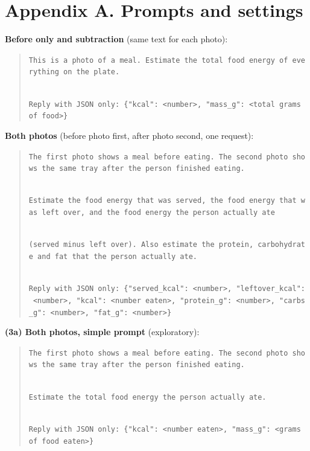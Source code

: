 \documentclass[
  11pt,
  letterpaper]{article}
\begin{document}
\section*{Appendix A. Prompts and settings}\label{appendix-a.-prompts-and-settings}

\textbf{Before only and subtraction} (same text for each photo):

\begin{quote}
\texttt{This\ is\ a\ photo\ of\ a\ meal.\ Estimate\ the\ total\ food\ energy\ of\ everything\ on\ the\ plate.}\strut \\
\texttt{Reply\ with\ JSON\ only:\ \{"kcal":\ \textless{}number\textgreater{},\ "mass\_g":\ \textless{}total\ grams\ of\ food\textgreater{}\}}
\end{quote}

\textbf{Both photos} (before photo first, after photo second, one request):

\begin{quote}
\texttt{The\ first\ photo\ shows\ a\ meal\ before\ eating.\ The\ second\ photo\ shows\ the\ same\ tray\ after\ the\ person\ finished\ eating.}\strut \\
\texttt{Estimate\ the\ food\ energy\ that\ was\ served,\ the\ food\ energy\ that\ was\ left\ over,\ and\ the\ food\ energy\ the\ person\ actually\ ate}\strut \\
\texttt{(served\ minus\ left\ over).\ Also\ estimate\ the\ protein,\ carbohydrate\ and\ fat\ that\ the\ person\ actually\ ate.}\strut \\
\texttt{Reply\ with\ JSON\ only:\ \{"served\_kcal":\ \textless{}number\textgreater{},\ "leftover\_kcal":\ \textless{}number\textgreater{},\ "kcal":\ \textless{}number\ eaten\textgreater{},\ "protein\_g":\ \textless{}number\textgreater{},\ "carbs\_g":\ \textless{}number\textgreater{},\ "fat\_g":\ \textless{}number\textgreater{}\}}
\end{quote}

\textbf{(3a) Both photos, simple prompt} (exploratory):

\begin{quote}
\texttt{The\ first\ photo\ shows\ a\ meal\ before\ eating.\ The\ second\ photo\ shows\ the\ same\ tray\ after\ the\ person\ finished\ eating.}\strut \\
\texttt{Estimate\ the\ total\ food\ energy\ the\ person\ actually\ ate.}\strut \\
\texttt{Reply\ with\ JSON\ only:\ \{"kcal":\ \textless{}number\ eaten\textgreater{},\ "mass\_g":\ \textless{}grams\ of\ food\ eaten\textgreater{}\}}
\end{quote}
\end{document}
